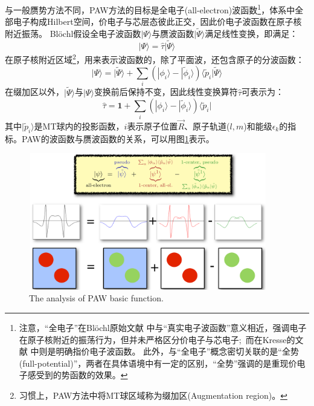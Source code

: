 {%
与一般赝势方法不同，PAW方法的目标是全电子(all-electron)波函数\footnote{注意，“全电子”在\textrm{Bl\"ochl}原始文献%
中与“真实电子波函数”意义相近，强调电子在原子核附近的振荡行为，但并未严格区分价电子与芯电子;~而在\textrm{Kresse}的文献%
中则是明确指价电子波函数。%
此外，与“全电子”概念密切关联的是“全势(full-potential)”，两者在具体语境中有一定的区别，“全势”强调的是重现价电子感受到的势函数的效果。}，体系中全部电子构成\textrm{Hilbert}空间，价电子与芯层态彼此正交，因此价电子波函数在原子核附近振荡。
\textrm{Bl\"ochl}假设全电子波函数$|\Psi\rangle$与赝波函数$|\tilde\Psi\rangle$满足线性变换，即满足：
\begin{equation}
	|\Psi\rangle=\hat{\tau}|\tilde\Psi\rangle
	\label{eq:PAW-Blochl-01}
\end{equation}
在原子核附近区域\footnote{习惯上，PAW方法中将MT球区域称为缀加区(\textrm{Augmentation region})。}，用来表示波函数的，除了平面波，还包含原子的分波函数：
\begin{equation}
	|\Psi\rangle=|\tilde\Psi\rangle+\sum_i(|\phi_i\rangle-|\tilde\phi_i\rangle)\langle\tilde p_i|\tilde\Psi\rangle
	\label{eq:PAW-Blochl-02}
\end{equation}
在缀加区以外，$|\tilde\Psi\rangle$与$|\Psi\rangle$变换前后保持不变，因此线性变换算符$\hat{\tau}$可表示为：
\begin{equation}
	\hat{\tau}=\mathbf{1}+\sum_i(|\phi_i\rangle-|\tilde\phi_i\rangle)\langle\tilde p_i|
	\label{eq:PAW-Blochl-03}
\end{equation}
其中$|\tilde p_i\rangle$是\textrm{MT}球内的投影函数，$i$表示原子位置$\vec R$、原子轨道($l,m$)和能级$\epsilon_k$的指标。\textrm{PAW}的波函数与赝波函数的关系，可以用图\ref{PAW_basic}表示。
\begin{figure}[h!]
\centering
\includegraphics[height=2.35in,width=4.1in,viewport=0 0 1280 745,clip]{Figures/PAW-baseset.png}
\caption{\small \textrm{The analysis of PAW basic function.}}%
\label{PAW_basic}
\end{figure}

}
